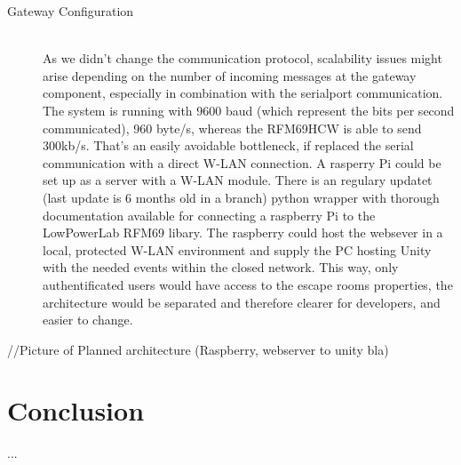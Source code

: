 \begin{description}
    \item[Gateway Configuration]\hfill \\
    As we didn't change the communication protocol, scalability issues might arise depending on the number of incoming messages at the gateway component, 
    especially in combination with the serialport communication. 
    The system is running with 9600 baud (which represent the bits per second communicated), 
    960 byte/s, whereas the RFM69HCW is able to send 300kb/s. 
    That's an easily avoidable bottleneck, if replaced the serial communication with a direct W-LAN connection. 
    A rasperry Pi could be set up as a server with a W-LAN module. There is an regulary updatet (last update is 6 months old in a branch) python wrapper \parencite{raspberrypiLibRFM} with thorough documentation \parencite{raspberrypiDoc} available for connecting 
    a raspberry Pi to the LowPowerLab RFM69 libary. 
    The raspberry could host the websever in a local, protected W-LAN environment and 
    supply the PC hosting Unity with the needed events within the closed network. 
    This way, only authentificated users would have access to the escape rooms properties, the architecture would be separated and therefore clearer for developers, and easier to change.
     \parencite{raspberrypiDoc}
\end{description}
//Picture of Planned architecture (Raspberry, webserver to unity bla)


\section{Conclusion}
...



